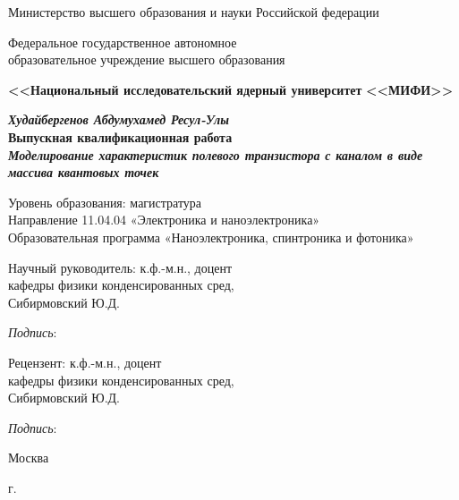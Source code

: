\begin{titlepage}
\begin{center}
Министерство высшего образования и науки Российской федерации

Федеральное государственное автономное \\образовательное учреждение высшего образования

\textbf{<<Национальный исследовательский ядерный университет}
\textbf{<<МИФИ>>}

\vspace{25mm}

\textbf{\textit{\large Худайбергенов Абдумухамед Ресул-Улы}} \\[8mm]
\textbf{\large Выпускная квалификационная работа}\\[3mm]
\vspace{25mm}
\textbf{\textit{\large Моделирование характеристик полевого транзистора
с каналом в виде массива квантовых точек}}

\vspace{15mm}
Уровень образования: магистратура\\
Направление 11.04.04 «Электроника и наноэлектроника»\\
Образовательная программа
«Наноэлектроника, спинтроника и фотоника»

\vspace{10mm}

\begin{flushright}
\begin{minipage}[t]{0.7\textwidth}
{Научный руководитель:} к.ф.-м.н., доцент\\
кафедры физики конденсированных сред, \\Сибирмовский Ю.Д. 

\vspace{5mm}

\textit{Подпись}: \hrulefill

\vspace{10mm}

{Рецензент:} к.ф.-м.н., доцент\\
кафедры физики конденсированных сред, \\Сибирмовский Ю.Д. 

\vspace{5mm}

\textit{Подпись}: \hrulefill

\end{minipage}
\end{flushright}

\vfill 

{Москва}
\par{\the\year{} г.}
\end{center}
\end{titlepage}
\restoregeometry
\addtocounter{page}{1}
